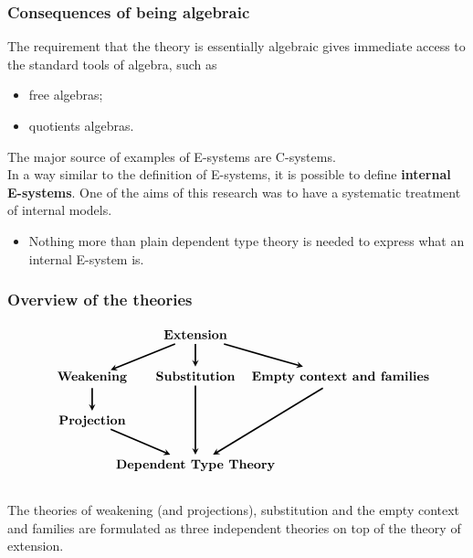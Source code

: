 \documentclass{beamer}
\newcommand\important[1]{\textbf{\color{red!90!black}#1}}
\begin{document}
\begin{frame}
\frametitle{\bf Consequences of being algebraic}
The requirement that the theory is essentially algebraic gives immediate access to the standard tools of algebra, such as
\begin{itemize}
\item free algebras;
\item quotients algebras.
\end{itemize}
\pause
The major source of examples of E-systems are C-systems.
\\[\baselineskip]
\pause
In a way similar to the definition of E-systems, it is possible to define
\important{internal E-systems}. One of the aims of this research was to have
a systematic treatment of internal models.
\begin{itemize}
\item Nothing more than plain dependent type theory is needed to express what
an internal E-system is.
\end{itemize}
\end{frame}

\begin{frame}
\frametitle{\bf Overview of the theories}
\begin{equation*}
\begin{tikzcd}[ampersand replacement=\&,column sep=0em]
{} \& \textbf{Extension} \ar[very thick,-stealth]{dr} \ar[very thick,-stealth]{d} \ar[very thick,-stealth]{dl}
  \\
\makebox[.7cm]{\textbf{Weakening}} \ar[very thick,-stealth]{d} \& \textbf{Substitution} \ar[very thick,-stealth]{dd} \& \makebox[3cm]{\textbf{Empty context and families}} \ar[very thick,-stealth]{ddl}
\\
\makebox[.7cm]{\textbf{Projection}} \ar[very thick,-stealth]{dr}
\\
{} \& \textbf{Dependent Type Theory}
\end{tikzcd}
\end{equation*}
\\[2em]
\pause
The theories of weakening (and projections), substitution and the empty context and families are formulated as three independent theories on top of the theory of extension.
\end{frame}
\end{document}
